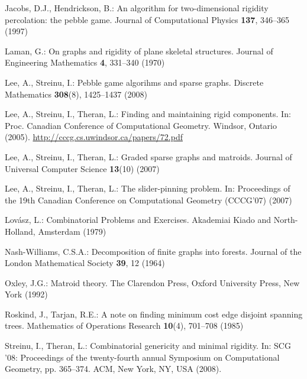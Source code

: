 \documentclass[Svgc,nospthms]{Svgc}
\begin{document}
\begin{thebibliography}{21}
Jacobs, D.J., Hendrickson, B.: An algorithm for two-dimensional rigidity
  percolation: the pebble game.
\newblock Journal of Computational Physics \textbf{137}, 346--365 (1997)

Laman, G.: On graphs and rigidity of plane skeletal structures.
\newblock Journal of Engineering Mathematics \textbf{4}, 331--340 (1970)

Lee, A., Streinu, I.: Pebble game algorihms and sparse graphs.
\newblock Discrete Mathematics \textbf{308}(8), 1425--1437 (2008)

Lee, A., Streinu, I., Theran, L.: Finding and maintaining rigid components.
\newblock In: Proc. Canadian Conference of Computational Geometry. Windsor,
  Ontario (2005).
\newblock \url{http://cccg.cs.uwindsor.ca/papers/72.pdf}

Lee, A., Streinu, I., Theran, L.: Graded sparse graphs and matroids.
\newblock Journal of Universal Computer Science \textbf{13}(10)
  (2007{})

Lee, A., Streinu, I., Theran, L.: The slider-pinning problem.
\newblock In: Proceedings of the 19th Canadian Conference on Computational
  Geometry (CCCG'07) (2007{})

Lov{\'{a}}sz, L.: Combinatorial Problems and Exercises.
\newblock Akademiai Kiado and North-Holland, Amsterdam (1979)

Nash-Williams, C.S.A.: Decomposition of finite graphs into forests.
\newblock Journal of the London Mathematical Society \textbf{39}, 12 (1964)

Oxley, J.G.: Matroid theory.
\newblock The Clarendon Press, Oxford University Press, New York (1992)

Roskind, J., Tarjan, R.E.: A note on finding minimum cost edge disjoint
  spanning trees.
\newblock Mathematics of Operations Research \textbf{10}(4), 701--708 (1985)

Streinu, I., Theran, L.: Combinatorial genericity and minimal rigidity.
\newblock In: SCG '08: Proceedings of the twenty-fourth annual Symposium on
  Computational Geometry, pp. 365--374. ACM, New York, NY, USA (2008).


\end{thebibliography}
\end{document}
